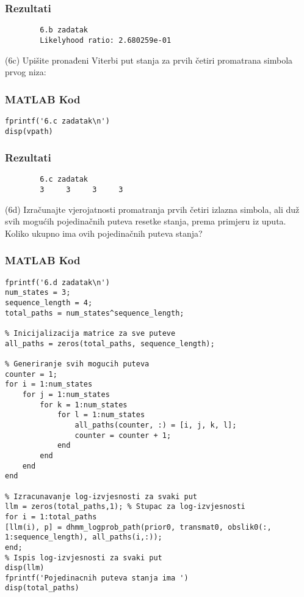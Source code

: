 \documentclass[12pt]{article}
\begin{document}
	\subsubsection*{Rezultati}
	\begin{verbatim}
		6.b zadatak
		Likelyhood ratio: 2.680259e-01
	\end{verbatim}
	
	(6c) Upišite pronađeni Viterbi put stanja za prvih četiri promatrana simbola prvog niza:
	\subsubsection*{MATLAB Kod}
	\begin{lstlisting}
fprintf('6.c zadatak\n')
disp(vpath)
	\end{lstlisting}
	
	\subsubsection*{Rezultati}
	\begin{verbatim}
		6.c zadatak
		3     3     3     3
	\end{verbatim}
	
	(6d) Izračunajte vjerojatnosti promatranja prvih četiri izlazna simbola, ali duž svih mogućih pojedinačnih puteva resetke stanja, prema primjeru iz uputa. Koliko ukupno ima ovih pojedinačnih puteva stanja?
	\subsubsection*{MATLAB Kod}
	\begin{lstlisting}
fprintf('6.d zadatak\n')
num_states = 3;     
sequence_length = 4;
total_paths = num_states^sequence_length;
	
% Inicijalizacija matrice za sve puteve
all_paths = zeros(total_paths, sequence_length);
	
% Generiranje svih mogucih puteva
counter = 1;
for i = 1:num_states
	for j = 1:num_states
		for k = 1:num_states
			for l = 1:num_states
				all_paths(counter, :) = [i, j, k, l];
				counter = counter + 1;
			end
		end
	end
end
	
% Izracunavanje log-izvjesnosti za svaki put
llm = zeros(total_paths,1); % Stupac za log-izvjesnosti
for i = 1:total_paths
[llm(i), p] = dhmm_logprob_path(prior0, transmat0, obslik0(:, 1:sequence_length), all_paths(i,:));
end;
% Ispis log-izvjesnosti za svaki put
disp(llm)
fprintf('Pojedinacnih puteva stanja ima ')
disp(total_paths)
	\end{lstlisting}
	
\end{document}

